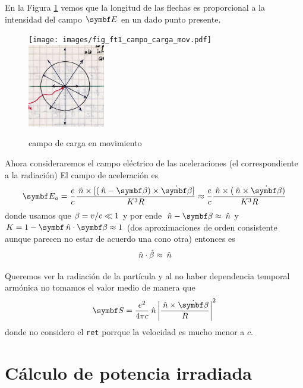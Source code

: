 \documentclass[10pt,oneside]{CBFT_book}
\begin{document}
En la Figura \ref{fig_ft1_campo_carga_mov} vemos que la longitud de las flechas es proporcional
a la intensidad del campo $\vb E$ en un dado punto presente.

\begin{figure}[htb]
	\begin{center}
	\texttt{[image: images/fig\_ft1\_campo\_carga\_mov.pdf]}
	\includegraphics[width=0.3\textwidth]{images/fig_ft1_campo_carga_movJPG2.jpg}
	\end{center}
	\caption{campo de carga en movimiento}
	\label{fig_ft1_campo_carga_mov}
\end{figure}

Ahora consideraremos el campo eléctrico de las aceleraciones (el correspondiente a la radiación)
El campo de aceleración es
\[
	\vb{E}_a = \frac{e}{c} \frac{ \nver \times [ (\nver-\vb{\b})\times \dot{\vb{\b}} ]}{K^3 R} 
		\approx \frac{e}{c} \frac{ \nver \times ( \nver \times \dot{\vb{\b}})}{K^3 R} 
\]
donde usamos que $\beta = v/c \ll 1$ y por ende $\nver-\vb{\b} \approx \nver$ y 
$ K = 1 - \pe{\nver}{\b} \approx 1$ (dos aproximaciones de orden consistente aunque parecen
no estar de acuerdo una cono otra) entonces es 
\[
	\:\hat{n} \cdot \hat{\beta} \approx \:\hat{n}
\]

Queremos ver la radiación de la partícula y al no haber dependencia temporal armónica no tomamos
el valor medio de manera que
\[
	\vb{S} = \frac{e^2}{4\pi c}\nver \left| \frac{\nver \times \dot{\vb{\b}}}{R}\right|^2
\]
donde no considero el \texttt{ret} porrque la velocidad es mucho menor a $c$.

\section{Cálculo de potencia irradiada}
\end{document}
